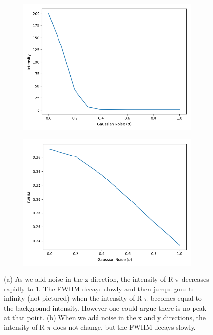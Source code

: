 \documentclass{article}
\begin{document}
  \begin{figure}
  \centering
  \begin{subfigure}{0.45\textwidth}
  \includegraphics[width=\textwidth]{random_layers_z_noise.png}
  \caption{}\label{fig:random_layers_z_noise}
  \end{subfigure}
  \begin{subfigure}{0.45\textwidth}
  \includegraphics[width=\textwidth]{random_layers_xy_noise.png}
  \caption{}\label{fig:random_layers_xy_noise}
  \end{subfigure}
  \caption{(a) As we add noise in the z-direction, the intensity of R-$\pi$ decreases
   rapidly to 1. The FWHM decays slowly and then jumps goes to infinity (not pictured) 
   when the intensity of R-$\pi$ becomes equal to the background intensity. However one 
   could argue there is no peak at that point. (b) When we add noise in the x and y 
   directions, the intensity of R-$\pi$ does not change, but the FWHM decays slowly.}\label{fig:layers_noise}
  \end{figure}
\end{document}
